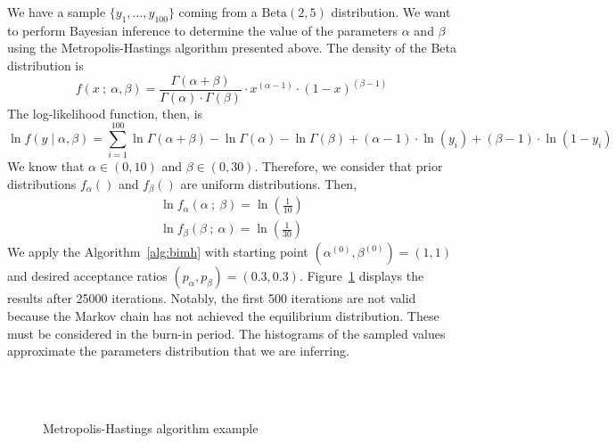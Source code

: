 \documentclass[11pt,fleqn]{book} %
\begin{document}
\begin{example}
	We have a sample $\{y_1,\dots,y_{100}\}$ coming from a $\text{Beta}(2,5)$ 
	distribution. We want to perform Bayesian inference to determine the value 
	of the parameters $\alpha$ and $\beta$ using the Metropolis-Hastings 
	algorithm presented above. The density of the Beta distribution is
	\begin{displaymath}
		f(x\ ;\ \alpha, \beta) = 
		\frac{\Gamma(\alpha+\beta)}{\Gamma(\alpha) \cdot \Gamma(\beta)} 
		\cdot x^{(\alpha-1)} \cdot (1-x)^{(\beta-1)}
	\end{displaymath}
	The log-likelihood function, then, is
	\begin{displaymath}
		\ln f(y \mid \alpha, \beta) = 
		\displaystyle \sum_{i=1}^{100} 
		\ln \Gamma(\alpha+\beta) - \ln \Gamma(\alpha) - \ln \Gamma(\beta) +
		(\alpha-1) \cdot \ln(y_i) + (\beta-1) \cdot \ln(1-y_i)
	\end{displaymath}
	We know that $\alpha \in (0,10)$ and $\beta \in (0,30)$. Therefore, we 
	consider that prior distributions $f_{\alpha}()$ and $f_{\beta}()$ are 
	uniform distributions. Then,
	\begin{displaymath}
		\begin{array}{l}
			\ln f_{\alpha}(\alpha \ ;\ \beta) = \ln(\frac{1}{10})
			\\
			\ln f_{\beta}(\beta \ ;\ \alpha) = \ln(\frac{1}{30})
		\end{array}
	\end{displaymath}
	We apply the Algorithm~\ref{alg:bimh} with starting point 
	$\left(\alpha^{(0)},\beta^{(0)}\right)=(1,1)$ and 
	desired acceptance ratios $(p_{\alpha},p_{\beta})=(0.3,0.3)$.
	Figure~\ref{fig:mhbd} displays the results after \num{25000} iterations.
	Notably, the first 500 iterations are not valid because the Markov 
	chain has not achieved the equilibrium distribution. These must be 
	considered in the burn-in period. The histograms of the sampled values
	approximate the parameters distribution that we are inferring.
\end{example}

\begin{figure}[!ht]
	\centering
	\\
	\\
	\caption{Metropolis-Hastings algorithm example}
	\label{fig:mhbd}
\end{figure}
\end{document}
